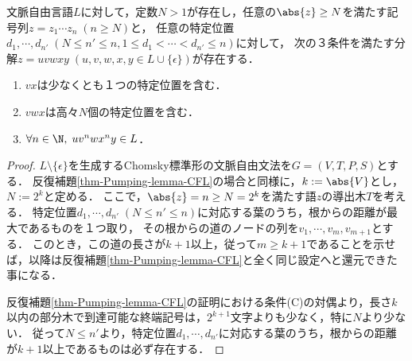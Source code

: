 \begin{theorem}[Ogden]\label{thm-Ogden}
    文脈自由言語$L$に対して，定数$N>1$が存在し，任意の$\abs{z}\ge N$を満たす記号列$z=z_1\cdots z_n\;(n\ge N)$と，
    任意の特定位置$d_1,\cdots,d_{n'}\;(N\le n'\le n,1\le d_1<\cdots<d_{n'}\le n)$に対して，
    次の３条件を満たす分解$z=uvwxy\;(u,v,w,x,y\in L\cup\{\epsilon\})$が存在する．
    \begin{enumerate}
        \item $vx$は少なくとも１つの特定位置を含む．
        \item $vwx$は高々$N$個の特定位置を含む．
        \item $\forall n\in\N,\;uv^nwx^ny\in L$．
    \end{enumerate}
\end{theorem}
\begin{proof}
    $L\setminus\{\epsilon\}$を生成するChomsky標準形の文脈自由文法を$G=(V,T,P,S)$とする．
    反復補題\ref{thm-Pumping-lemma-CFL}の場合と同様に，$k:=\abs{V}$とし，$N:=2^k$と定める．
    ここで，$\abs{z}=n\ge N=2^k$を満たす語$z$の導出木$T$を考える．
    特定位置$d_1,\cdots,d_{n'}\;(N\le n'\le n)$に対応する葉のうち，根からの距離が最大であるものを１つ取り，
    その根からの道のノードの列を$v_1,\cdots,v_m,v_{m+1}$とする．
    このとき，この道の長さが$k+1$以上，従って$m\ge k+1$であることを示せば，以降は反復補題\ref{thm-Pumping-lemma-CFL}と全く同じ設定へと還元できた事になる．

    反復補題\ref{thm-Pumping-lemma-CFL}の証明における条件(C)の対偶より，長さ$k$以内の部分木で到達可能な終端記号は，$2^{k+1}$文字よりも少なく，特に$N$より少ない．
    従って$N\le n'$より，特定位置$d_1,\cdots,d_{n'}$に対応する葉のうち，根からの距離が$k+1$以上であるものは必ず存在する．
\end{proof}

